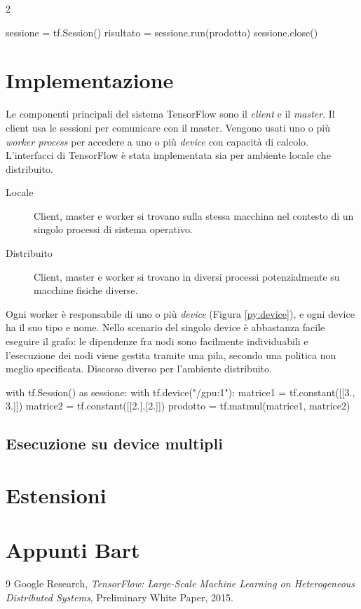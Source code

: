 \documentclass[DIV=calc, paper=a4, fontsize=11pt]{scrartcl}	 %
\begin{document}
\begin{multicols}{2}
			\begin{figure*}
				\centering
				\begin{python}
sessione = tf.Session()
risultato = sessione.run(prodotto)
sessione.close()
				\end{python}
				\caption{Lancio di esecuzione del grafo tramite sessione}
				\label{py:lancio}
			\end{figure*}
		
		\section{Implementazione}
			Le componenti principali del sistema TensorFlow sono il \textit{client} e il \textit{master}. Il client usa le sessioni per comunicare con il master. Vengono usati uno o più \textit{worker process} per accedere a uno o più \textit{device} con capacità di calcolo. L'interfacci di TensorFlow è stata implementata sia per ambiente locale che distribuito.
			\begin{description}
				\item[Locale] Client, master e worker si trovano sulla stessa macchina nel contesto di un singolo processi di sistema operativo.
				\item[Distribuito] Client, master e worker si trovano in diversi processi potenzialmente su macchine fisiche diverse.
			\end{description}
			Ogni worker è responsabile di uno o più \textit{device} (Figura \ref{py:device}), e ogni device ha il suo tipo e nome. Nello scenario del singolo device è abbastanza facile eseguire il grafo: le dipendenze fra nodi sono facilmente individuabili e l'esecuzione dei nodi viene gestita tramite una pila, secondo una politica non meglio specificata. Discorso diverso per l'ambiente distribuito.
			\begin{figure*}
				\centering
				\begin{python}
with tf.Session() as sessione:
	with tf.device("/gpu:1"):
		matrice1 = tf.constant([[3., 3.]])
		matrice2 = tf.constant([[2.],[2.]])
		prodotto = tf.matmul(matrice1, matrice2)
				\end{python}
				\caption{Vincolo di esecuzione tramite la \texttt{GPU 1} presente nel sistema}
				\label{py:device}
			\end{figure*}
			\subsection{Esecuzione su device multipli}
			
		\section{Estensioni}
		
		\section{Appunti Bart}		
		
		\begin{thebibliography}{9}
			Google Research,
			\emph{TensorFlow: Large-Scale Machine Learning on Heterogeneous Distributed Systems},
			Preliminary White Paper,
			2015.
		\end{thebibliography}
	\end{multicols}
\end{document}
